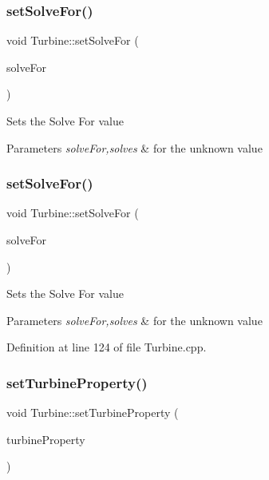 \subsubsection{\texorpdfstring{set\+Solve\+For()}{setSolveFor()}\hspace{0.1cm}{\footnotesize\ttfamily [2/3]}}
{\footnotesize\ttfamily void Turbine\+::set\+Solve\+For (\begin{DoxyParamCaption}\item[{\hyperlink{class_turbine_a9fd7beba6c6f071e228fbe3e07969d2b}{Solve}}]{solve\+For }\end{DoxyParamCaption})}

Sets the Solve For value


\begin{DoxyParams}{Parameters}
{\em solve\+For,solves} & for the unknown value \\
\hline
\end{DoxyParams}
\mbox{\label{class_turbine_a96f54a8fc572dae6c5298289de890f4d}} 
\subsubsection{\texorpdfstring{set\+Solve\+For()}{setSolveFor()}\hspace{0.1cm}{\footnotesize\ttfamily [3/3]}}
{\footnotesize\ttfamily void Turbine\+::set\+Solve\+For (\begin{DoxyParamCaption}\item[{\hyperlink{class_turbine_a9fd7beba6c6f071e228fbe3e07969d2b}{Turbine\+::\+Solve}}]{solve\+For }\end{DoxyParamCaption})}

Sets the Solve For value


\begin{DoxyParams}{Parameters}
{\em solve\+For,solves} & for the unknown value \\
\hline
\end{DoxyParams}


Definition at line 124 of file Turbine.\+cpp.

\mbox{\label{class_turbine_abb3f16cefe52f4e9c7b32b2bb17a68ee}} 
\subsubsection{\texorpdfstring{set\+Turbine\+Property()}{setTurbineProperty()}\hspace{0.1cm}{\footnotesize\ttfamily [1/3]}}
{\footnotesize\ttfamily void Turbine\+::set\+Turbine\+Property (\begin{DoxyParamCaption}\item[{\hyperlink{class_turbine_a5db4f65cf2539e3837684d53221ade12}{Turbine\+::\+Turbine\+Property}}]{turbine\+Property }\end{DoxyParamCaption})}

